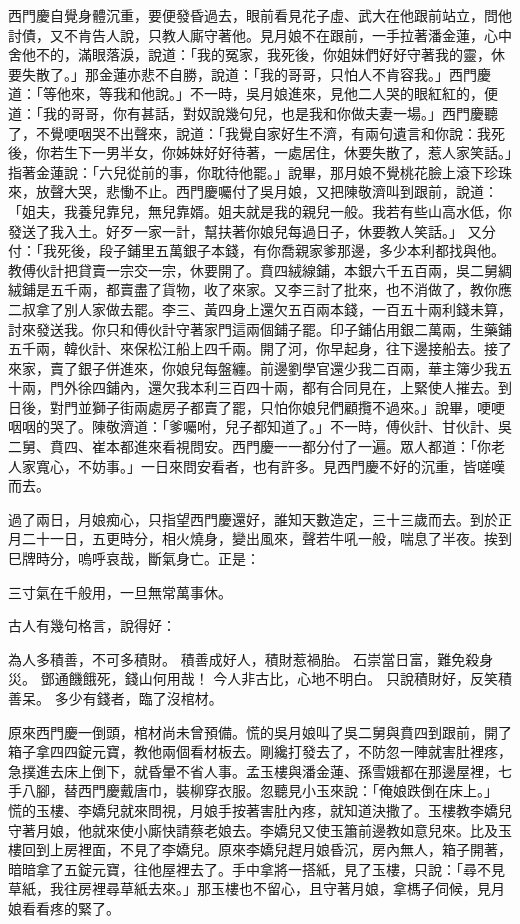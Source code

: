 西門慶自覺身體沉重，要便發昏過去，眼前看見花子虛、武大在他跟前站立，問他討債，又不肯告人說，只教人廝守著他。見月娘不在跟前，一手拉著潘金蓮，心中舍他不的，滿眼落淚，說道：「我的冤家，我死後，你姐妹們好好守著我的靈，休要失散了。」那金蓮亦悲不自勝，說道：「我的哥哥，只怕人不肯容我。」西門慶道：「等他來，等我和他說。」不一時，吳月娘進來，見他二人哭的眼紅紅的，便道：「我的哥哥，你有甚話，對奴說幾句兒，也是我和你做夫妻一場。」西門慶聽了，不覺哽咽哭不出聲來，說道：「我覺自家好生不濟，有兩句遺言和你說：我死後，你若生下一男半女，你姊妹好好待著，一處居住，休要失散了，惹人家笑話。」指著金蓮說：「六兒從前的事，你耽待他罷。」說畢，那月娘不覺桃花臉上滾下珍珠來，放聲大哭，悲慟不止。西門慶囑付了吳月娘，又把陳敬濟叫到跟前，說道：「姐夫，我養兒靠兒，無兒靠婿。姐夫就是我的親兒一般。我若有些山高水低，你發送了我入土。好歹一家一計，幫扶著你娘兒每過日子，休要教人笑話。」 又分付：「我死後，段子鋪里五萬銀子本錢，有你喬親家爹那邊，多少本利都找與他。教傅伙計把貸賣一宗交一宗，休要開了。賁四絨線鋪，本銀六千五百兩，吳二舅綢絨鋪是五千兩，都賣盡了貨物，收了來家。又李三討了批來，也不消做了，教你應二叔拿了別人家做去罷。李三、黃四身上還欠五百兩本錢，一百五十兩利錢未算，討來發送我。你只和傅伙計守著家門這兩個鋪子罷。印子鋪佔用銀二萬兩，生藥鋪五千兩，韓伙計、來保松江船上四千兩。開了河，你早起身，往下邊接船去。接了來家，賣了銀子併進來，你娘兒每盤纏。前邊劉學官還少我二百兩，華主簿少我五十兩，門外徐四鋪內，還欠我本利三百四十兩，都有合同見在，上緊使人摧去。到日後，對門並獅子街兩處房子都賣了罷，只怕你娘兒們顧攬不過來。」說畢，哽哽咽咽的哭了。陳敬濟道：「爹囑咐，兒子都知道了。」不一時，傅伙計、甘伙計、吳二舅、賁四、崔本都進來看視問安。西門慶一一都分付了一遍。眾人都道：「你老人家寬心，不妨事。」一日來問安看者，也有許多。見西門慶不好的沉重，皆嗟嘆而去。

過了兩日，月娘痴心，只指望西門慶還好，誰知天數造定，三十三歲而去。到於正月二十一日，五更時分，相火燒身，變出風來，聲若牛吼一般，喘息了半夜。挨到巳牌時分，嗚呼哀哉，斷氣身亡。正是：

三寸氣在千般用，一旦無常萬事休。

古人有幾句格言，說得好：

為人多積善，不可多積財。
積善成好人，積財惹禍胎。
石崇當日富，難免殺身災。
鄧通饑餓死，錢山何用哉！
今人非古比，心地不明白。
只說積財好，反笑積善呆。
多少有錢者，臨了沒棺材。

原來西門慶一倒頭，棺材尚未曾預備。慌的吳月娘叫了吳二舅與賁四到跟前，開了箱子拿四四錠元寶，教他兩個看材板去。剛纔打發去了，不防忽一陣就害肚裡疼，急撲進去床上倒下，就昏暈不省人事。孟玉樓與潘金蓮、孫雪娥都在那邊屋裡，七手八腳，替西門慶戴唐巾，裝柳穿衣服。忽聽見小玉來說：「俺娘跌倒在床上。」 慌的玉樓、李嬌兒就來問視，月娘手按著害肚內疼，就知道決撒了。玉樓教李嬌兒守著月娘，他就來使小廝快請蔡老娘去。李嬌兒又使玉簫前邊教如意兒來。比及玉樓回到上房裡面，不見了李嬌兒。原來李嬌兒趕月娘昏沉，房內無人，箱子開著，暗暗拿了五錠元寶，往他屋裡去了。手中拿將一搭紙，見了玉樓，只說：「尋不見草紙，我往房裡尋草紙去來。」那玉樓也不留心，且守著月娘，拿榪子伺候，見月娘看看疼的緊了。

